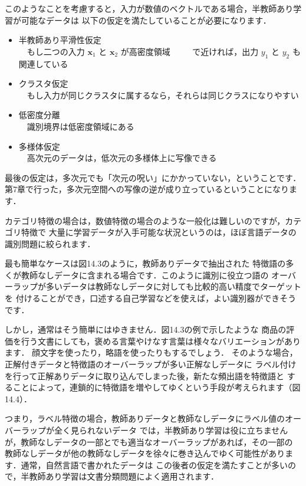 
このようなことを考慮すると，入力が数値のベクトルである場合，半教師あり学習が可能なデータは
以下の仮定を満たしていることが必要になります．

\begin{itemize}
\item 半教師あり平滑性仮定\\
　もし二つの入力 $\bm{x}_1$ と $\bm{x}_2$ が高密度領域
　
　で近ければ，出力 $y_1$ と $y_2$ も関連している
\item クラスタ仮定\\
　もし入力が同じクラスタに属するなら，それらは同じクラスになりやすい
\item 低密度分離\\
　識別境界は低密度領域にある
\item 多様体仮定\\
　高次元のデータは，低次元の多様体上に写像できる
\end{itemize}

最後の仮定は，多次元でも「次元の呪い」にかかっていない，ということです．
第7章で行った，多次元空間への写像の逆が成り立っているということになります．



カテゴリ特徴の場合は，数値特徴の場合のような一般化は難しいのですが，カテゴリ特徴で
大量に学習データが入手可能な状況というのは，ほぼ言語データの識別問題に絞られます．

最も簡単なケースは図14.3のように，教師ありデータで抽出された
特徴語の多くが教師なしデータに含まれる場合です．このように識別に役立つ語の
オーバーラップが多いデータは教師なしデータに対しても比較的高い精度でターゲットを
付けることができ，口述する自己学習などを使えば，よい識別器ができそうです．



しかし，通常はそう簡単にはゆきません．図14.3の例で示したような
商品の評価を行う文書にしても，褒める言葉やけなす言葉は様々なバリエーションがあります．
顔文字を使ったり，略語を使ったりもするでしょう．
そのような場合，正解付きデータと特徴語のオーバーラップが多い正解なしデータに
ラベル付けを行って正解ありデータに取り込んでしまった後，新たな頻出語を特徴語と
することによって，連鎖的に特徴語を増やしてゆくという手段が考えられます（図14.4）．


つまり，ラベル特徴の場合，教師ありデータと教師なしデータにラベル値のオーバーラップが全く見られないデータ
では，半教師あり学習は役に立ちませんが，教師なしデータの一部とでも適当なオーバーラップがあれば，その一部の
教師なしデータが他の教師なしデータを徐々に巻き込んでゆく可能性があります．通常，自然言語で書かれたデータは
この後者の仮定を満たすことが多いので，半教師あり学習は文書分類問題によく適用されます．

